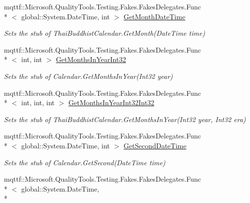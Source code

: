 \begin{DoxyCompactItemize}
mqttf\-::\-Microsoft.\-Quality\-Tools.\-Testing.\-Fakes.\-Fakes\-Delegates.\-Func\\*
$<$ global\-::\-System.\-Date\-Time, int $>$ \hyperlink{class_system_1_1_globalization_1_1_fakes_1_1_stub_thai_buddhist_calendar_a66e294acd95f0295877147daa25cb795}{Get\-Month\-Date\-Time}
\begin{DoxyCompactList}\small\item\em Sets the stub of Thai\-Buddhist\-Calendar.\-Get\-Month(\-Date\-Time time)\end{DoxyCompactList}\item 
mqttf\-::\-Microsoft.\-Quality\-Tools.\-Testing.\-Fakes.\-Fakes\-Delegates.\-Func\\*
$<$ int, int $>$ \hyperlink{class_system_1_1_globalization_1_1_fakes_1_1_stub_thai_buddhist_calendar_a63b72fa94ac038faff893867e3755c38}{Get\-Months\-In\-Year\-Int32}
\begin{DoxyCompactList}\small\item\em Sets the stub of Calendar.\-Get\-Months\-In\-Year(\-Int32 year)\end{DoxyCompactList}\item 
mqttf\-::\-Microsoft.\-Quality\-Tools.\-Testing.\-Fakes.\-Fakes\-Delegates.\-Func\\*
$<$ int, int, int $>$ \hyperlink{class_system_1_1_globalization_1_1_fakes_1_1_stub_thai_buddhist_calendar_ab130494586ca45951aeb85cc04f0a4a4}{Get\-Months\-In\-Year\-Int32\-Int32}
\begin{DoxyCompactList}\small\item\em Sets the stub of Thai\-Buddhist\-Calendar.\-Get\-Months\-In\-Year(\-Int32 year, Int32 era)\end{DoxyCompactList}\item 
mqttf\-::\-Microsoft.\-Quality\-Tools.\-Testing.\-Fakes.\-Fakes\-Delegates.\-Func\\*
$<$ global\-::\-System.\-Date\-Time, int $>$ \hyperlink{class_system_1_1_globalization_1_1_fakes_1_1_stub_thai_buddhist_calendar_a44f99d50865189a046508f36b6682c45}{Get\-Second\-Date\-Time}
\begin{DoxyCompactList}\small\item\em Sets the stub of Calendar.\-Get\-Second(\-Date\-Time time)\end{DoxyCompactList}\item 
mqttf\-::\-Microsoft.\-Quality\-Tools.\-Testing.\-Fakes.\-Fakes\-Delegates.\-Func\\*
$<$ global\-::\-System.\-Date\-Time, \\*

\end{DoxyCompactItemize}
